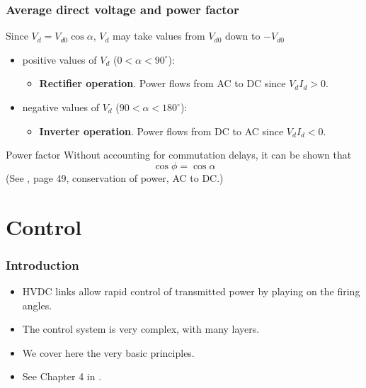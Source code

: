 \begin{frame}
\frametitle{Average direct voltage and power factor}
Since $V_{d} = V_{d0} \cos \alpha$, $V_d$ may take values from $V_{d0}$ down to $-V_{d0}$
\begin{itemize}
    \item positive values of $V_d$ ($0 < \alpha < 90^{\circ}$):
    \begin{itemize}
        \item \textbf{Rectifier operation}. Power flows from AC to DC since $V_d I_d > 0$.
    \end{itemize}
    \item negative values of $V_d$ ($90 < \alpha < 180^{\circ}$):
    \begin{itemize}
        \item \textbf{Inverter operation}. Power flows from DC to AC since $V_d I_d < 0$.
    \end{itemize}
    
\end{itemize}
\begin{block}{Power factor}
Without accounting for commutation delays, it can be shown that
$$\cos \phi = \cos \alpha$$    (See \cite{padiyar1990hvdc}, page 49, conservation of power, AC to DC.)
\end{block}
\end{frame}



\section{Control}


\begin{frame}
    \frametitle{Introduction}

    \begin{itemize}
        \item HVDC links allow rapid control of transmitted power by playing on the firing angles.
        \item The control system is very complex, with many layers.  
        \item We cover here the very basic principles.
        \item See Chapter 4 in \cite{padiyar1990hvdc}.
    \end{itemize}
\end{frame}

